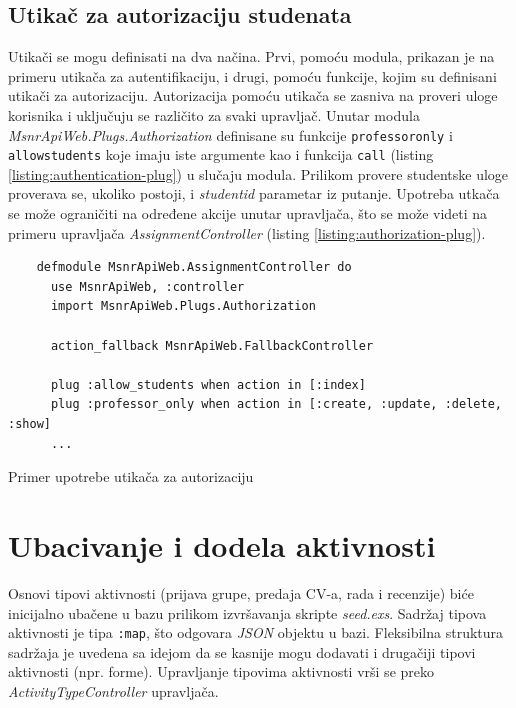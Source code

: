\documentclass[12pt,oneside]{memoir}
\begin{document}
\subsection{Utikač za autorizaciju studenata}
Utikači se mogu definisati na dva načina. Prvi, pomoću modula, prikazan je na primeru utikača za autentifikaciju,
i drugi, pomoću funkcije, kojim su definisani utikači za autorizaciju. Autorizacija pomoću utikača se zasniva na
proveri uloge korisnika i uključuju se različito za svaki upravljač.
Unutar modula \emph{MsnrApiWeb.Plugs.Authorization}
definisane su funkcije \texttt{professor{\textunderscore}only} i \texttt{allow{\textunderscore}students} koje imaju
iste argumente kao i funkcija \texttt{call} (listing \ref{listing:authentication-plug}) u slučaju modula.
Prilikom provere studentske uloge proverava se, ukoliko postoji, i \emph{student{\textunderscore}id} parametar iz putanje.
Upotreba utkača se može ograničiti na određene akcije unutar upravljača, što se može videti na primeru upravljača \emph{AssignmentController} (listing \ref{listing:authorization-plug}).
\begin{listing}[h!]
  \begin{verbatim}
    defmodule MsnrApiWeb.AssignmentController do
      use MsnrApiWeb, :controller
      import MsnrApiWeb.Plugs.Authorization
    
      action_fallback MsnrApiWeb.FallbackController
    
      plug :allow_students when action in [:index]
      plug :professor_only when action in [:create, :update, :delete, :show]
      ...
\end{verbatim}
\caption{Primer upotrebe utikača za autorizaciju}
\label{listing:authorization-plug}
\end{listing}
\section{Ubacivanje i dodela aktivnosti}
Osnovi tipovi aktivnosti (prijava grupe, predaja CV-a, rada i recenzije) biće inicijalno ubačene u
bazu prilikom izvršavanja skripte \emph{seed.exs}. Sadržaj tipova aktivnosti je tipa \texttt{:map}, što odgovara
\emph{JSON} objektu u bazi. Fleksibilna struktura sadržaja je uvedena sa idejom da se kasnije mogu dodavati i drugačiji
tipovi aktivnosti (npr. forme). Upravljanje tipovima aktivnosti vrši se preko \emph{ActivityTypeController} upravljača.
\end{document}
